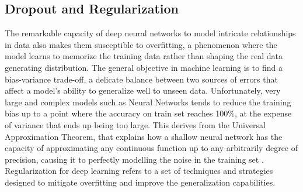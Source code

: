 \documentclass[binding=0.7cm, oneside]{sapthesis}
\begin{document}
\subsection{Dropout and Regularization}
The remarkable capacity of deep neural networks to model intricate relationships in data also makes them susceptible to overfitting, a phenomenon where the model learns to memorize the training data rather than shaping the real data generating distribution. The general objective in machine learning is to find a bias-variance trade-off, a delicate balance between two sources of errors that affect a model's ability to generalize well to unseen data. Unfortunately,
very large and complex models such as Neural Networks tends to reduce the training bias up to a point where the accuracy on train set reaches 100\%, at the expense of variance that ends up being too large. This derives from the Universal Approximation Theorem, that explains how a shallow neural network has the capacity of approximating any continuous function up to any arbitrarily degree of precision, causing it to perfectly modelling the noise in the training set \cite{overfitting}.
Regularization for deep learning refers to a set of techniques and strategies designed to mitigate overfitting and improve the generalization capabilities.




\end{document}
